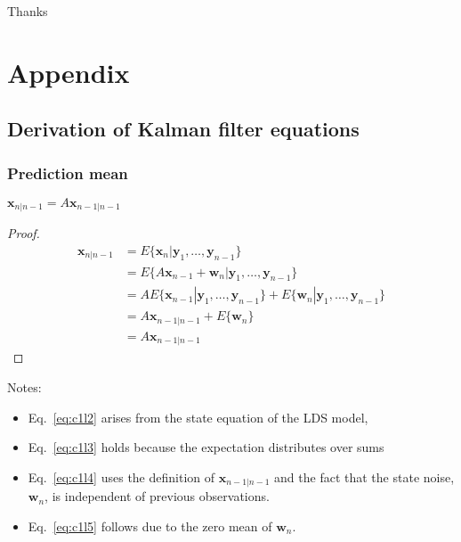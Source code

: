 \begin{frame}
\Huge{\centerline{Thanks}}
\end{frame}

\section{Appendix}

\subsection{Derivation of Kalman filter equations}

\begin{frame}
    \frametitle{Prediction mean}

    \scriptsize
\begin{claim}
    $\mathbf{x}_{n|n-1}=A\mathbf{x}_{n-1|n-1}$
    \label{claim:predictionMean}
\end{claim}

\begin{proof}
    \begin{align}
        \mathbf{x}_{n|n-1}&=E\{\mathbf{x}_n|\mathbf{y}_1,\ldots,\mathbf{y}_{n-1}\}\nonumber\\
                          &=E\{A\mathbf{x}_{n-1}+\mathbf{w}_n|\mathbf{y}_1,\ldots,\mathbf{y}_{n-1}\}\label{eq:c1l2}\\
                          &=AE\{\mathbf{x}_{n-1}|\mathbf{y}_ 1,\ldots,\mathbf{y}_{n-1}\}+E\{\mathbf{w}_n|\mathbf{y}_1,\ldots,\mathbf{y}_{n-1}\}\label{eq:c1l3}\\
                          &=A\mathbf{x}_{n-1|n-1}+E\{\mathbf{w}_n\}\label{eq:c1l4}\\
                          &=A\mathbf{x}_{n-1|n-1\label{eq:c1l5}}
    \end{align}
\end{proof}

Notes:

\begin{itemize}

    \item Eq.~\ref{eq:c1l2} arises from the state equation of the LDS model,
    \item Eq.~\ref{eq:c1l3} holds because the expectation distributes over sums
    \item Eq.~\ref{eq:c1l4} uses the definition of $\mathbf{x}_{n-1|n-1}$ and
        the fact that the state noise, $\mathbf{w}_n$, is independent of previous observations.
    \item Eq.~\ref{eq:c1l5} follows due to the zero mean of $\mathbf{w}_n$.

\end{itemize}
    \normalsize

\end{frame}

